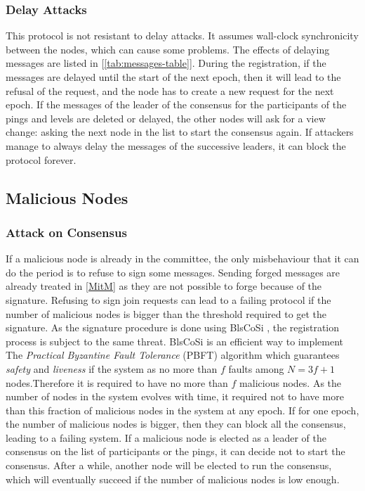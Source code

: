\documentclass[a4paper,11pt,oneside]{report}
\begin{document}
\subsubsection{Delay Attacks}
This protocol is not resistant to delay attacks. It assumes wall-clock
synchronicity between the nodes, which can cause some problems. The effects of
delaying messages are listed in [\autoref{tab:messages-table}]. During the
registration, if the messages are delayed until the start of the next epoch,
then it will lead to the refusal of the request, and the node has to create a
new request for the next epoch. If the messages of the leader of the consensus
for the participants of the pings and levels are deleted or delayed, the other
nodes will ask for a view change: asking the next node in the list to start the
consensus again. If attackers manage to always delay the messages of the
successive leaders, it can block the protocol forever.

\subsection{Malicious Nodes}
\subsubsection{Attack on Consensus} If a malicious
node is already in the committee, the only misbehaviour that it
can do the period is to refuse to sign some messages. Sending forged messages
are already treated in \autoref{MitM} as they are not possible to forge because
of the signature. Refusing to sign join requests can lead to a failing protocol
if the number of malicious nodes is bigger than the threshold required to get
the signature. As the signature procedure is done using BlsCoSi \cite{Boneh2018},
the registration process is subject to the same threat. BlsCoSi
\cite{Boneh2018} is an efficient way to implement The \textit{Practical
Byzantine Fault Tolerance} (PBFT) \cite{Castro1999} algorithm which guarantees
\textit{safety} and \textit{liveness} if the system as no more than $f$ faults
among $N = 3f+1$ nodes.Therefore it is required to have no more than $f$
malicious nodes. As the number of nodes in the system evolves
with time, it required not to have more than this fraction of malicious nodes
in the system at any epoch. If for one epoch, the number of malicious nodes is
bigger, then they can block all the consensus, leading to a failing system. 
If a malicious node is elected as a leader of the consensus on the list of
participants or the pings, it can decide not to start the consensus. After a
while, another node will be elected to run the consensus, which will eventually
succeed if the number of malicious nodes is low enough.
\end{document}

